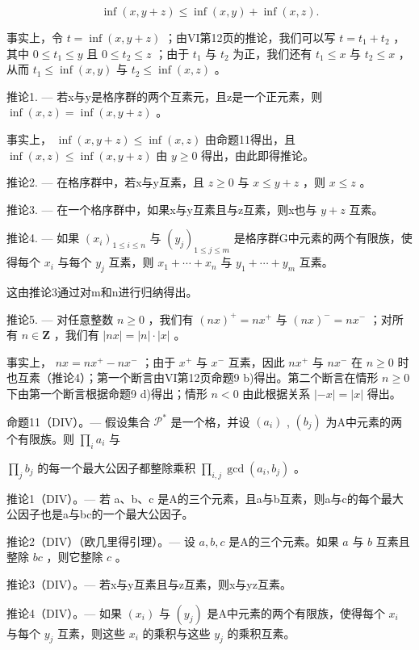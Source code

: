 \[
\inf (x, y + z) \leqslant \inf (x, y) + \inf (x, z).
\]

事实上，令 \(t = \inf(x, y + z)\) ；由VI第12页的推论，我们可以写 \(t = t_1 + t_2\) ，其中 \(0 \leqslant t_1 \leqslant y\) 且 \(0 \leqslant t_2 \leqslant z\) ；由于 \(t_1\) 与 \(t_2\) 为正，我们还有 \(t_1 \leqslant x\) 与 \(t_2 \leqslant x\) ，从而 \(t_1 \leqslant \inf(x, y)\) 与 \(t_2 \leqslant \inf(x, z)\) 。

推论1. --- 若x与y是格序群的两个互素元，且z是一个正元素，则 \(\inf(x, z) = \inf(x, y + z)\) 。

事实上， \(\inf (x,y + z)\leqslant \inf (x,z)\) 由命题11得出，且 \(\inf (x,z)\leqslant \inf (x,y + z)\) 由 \(y\geqslant 0\) 得出，由此即得推论。

推论2. --- 在格序群中，若x与y互素，且 \(z \geqslant 0\) 与 \(x \leqslant y + z\) ，则 \(x \leqslant z\) 。

推论3. --- 在一个格序群中，如果x与y互素且与z互素，则x也与 \(y + z\) 互素。

推论4. --- 如果 \((x_i)_{1 \leq i \leq n}\) 与 \((y_j)_{1 \leq j \leq m}\) 是格序群G中元素的两个有限族，使得每个 \(x_i\) 与每个 \(y_j\) 互素，则 \(x_1 + \cdots + x_n\) 与 \(y_1 + \cdots + y_m\) 互素。

这由推论3通过对m和n进行归纳得出。

推论5. --- 对任意整数 \(n \geqslant 0\) ，我们有 \((nx)^+ = nx^+\) 与 \((nx)^- = nx^-\) ；对所有 \(n \in \mathbf{Z}\) ，我们有 \(|nx| = |n| \cdot |x|\) 。

事实上， \(nx = nx^{+} - nx^{-}\) ；由于 \(x^{+}\) 与 \(x^{-}\) 互素，因此 \(nx^{+}\) 与 \(nx^{-}\) 在 \(n \geqslant 0\) 时也互素（推论4）；第一个断言由VI第12页命题9 b)得出。第二个断言在情形 \(n \geqslant 0\) 下由第一个断言根据命题9 d)得出；情形 \(n < 0\) 由此根据关系 \(|-x| = |x|\) 得出。

命题11（DIV）。--- 假设集合 \(\mathcal{P}^*\) 是一个格，并设 \((a_i)\) , \((b_j)\) 为A中元素的两个有限族。则 \(\prod_{i} a_i\) 与

\(\prod_{j} b_{j}\) 的每一个最大公因子都整除乘积 \(\prod_{i,j} \gcd(a_{i}, b_{j})\) 。

推论1（DIV）。--- 若 a、b、c 是A的三个元素，且a与b互素，则a与c的每个最大公因子也是a与bc的一个最大公因子。

推论2（DIV）（欧几里得引理）。--- 设 \(a, b, c\) 是A的三个元素。如果 \(a\) 与 \(b\) 互素且整除 \(bc\) ，则它整除 \(c\) 。

推论3（DIV）。--- 若x与y互素且与z互素，则x与yz互素。

推论4（DIV）。--- 如果 \((x_{i})\) 与 \((y_{j})\) 是A中元素的两个有限族，使得每个 \(x_{i}\) 与每个 \(y_{j}\) 互素，则这些 \(x_{i}\) 的乘积与这些 \(y_{j}\) 的乘积互素。

